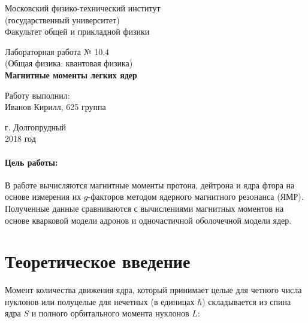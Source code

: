 \documentclass[12pt]{kiarticle}
\begin{document}
	
	\begin{titlepage}
		\begin{center}
			\large 	Московский физико-технический институт \\
			(государственный университет) \\
			Факультет общей и прикладной физики \\
			\vspace{0.2cm}
			
			\vspace{4.5cm}
			Лабораторная работа № 10.4 \\ \vspace{0.2cm}
			\large (Общая физика: квантовая физика) \\ \vspace{0.2cm}
			\LARGE \textbf{ Магнитные моменты легких ядер }
		\end{center}
		\vspace{2.3cm} \large
		
		\begin{center}
			Работу выполнил: \\
			Иванов Кирилл,
			625 группа
			\vspace{10mm}		
			
		\end{center}
		
		\begin{center} \vspace{60mm}
			г. Долгопрудный \\
			2018 год
		\end{center}
	\end{titlepage}


	\paragraph*{Цель работы:} 
	В работе вычисляются магнитные моменты протона, дейтрона и ядра фтора на основе измерения их $ g $-факторов методом ядерного магнитного резонанса (ЯМР). Полученные данные сравниваются с вычислениями магнитных моментов на основе кварковой модели адронов и одночастичной оболочечной модели ядер.
	
	
	\section{Теоретическое введение}
	
	Момент количества движения ядра, который принимает целые для четного числа нуклонов или полуцелые для нечетных (в единицах $ \hbar $) складывается из спина ядра $ S $ и полного орбитального момента нуклонов $ L $:
	
\end{document}
